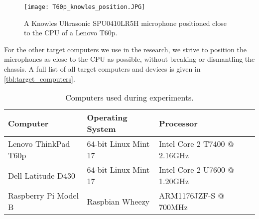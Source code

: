 \begin{figure}[ht]
  \centering
  \texttt{[image: T60p\_knowles\_position.JPG]}
  \caption{A Knowles Ultrasonic SPU0410LR5H microphone positioned close to the CPU of a Lenovo T60p.}
  \label{fig:T60p_knowles_position}
\end{figure}

For the other target computers we use in the research, we strive to position the microphones as close to the CPU as possible, without breaking or dismantling the chassis.
A full list of all target computers and devices is given in \autoref{tbl:target_computers}.

\begin{table}[h]
  \begin{tabular}{lll}
  Computer                  & Operating System      & Processor                    \\ \hline
  Lenovo ThinkPad T60p      & 64-bit Linux Mint 17  & Intel Core 2 T7400 @ 2.16GHz \\ %
  Dell Latitude D430        & 64-bit Linux Mint 17  & Intel Core 2 U7600 @ 1.20GHz \\ %
  Raspberry Pi Model B      & Raspbian Wheezy       & ARM1176JZF-S @ 700MHz        \\ %
  \end{tabular}
  \caption{Computers used during experiments.}
  \label{tbl:target_computers}
\end{table}

